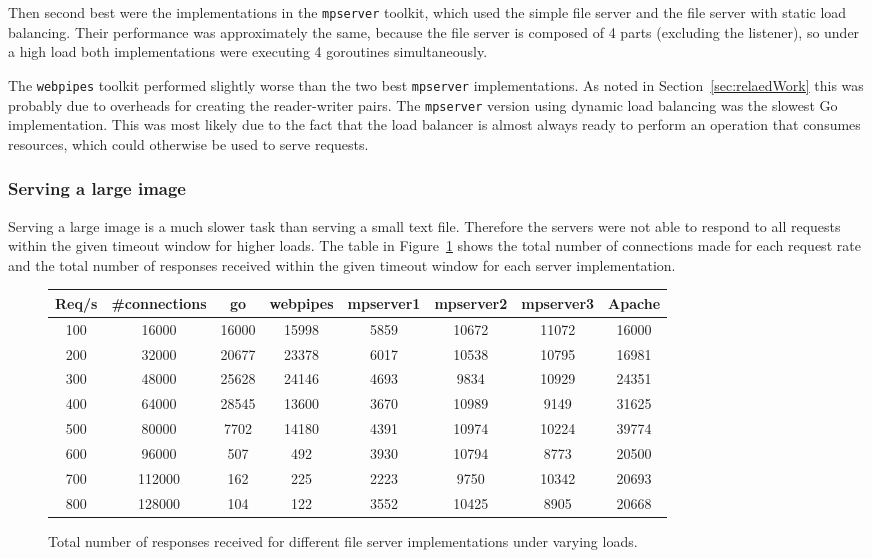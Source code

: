 Then second best were the implementations in the \texttt{mpserver}
toolkit, which used the simple file server and the file server with static load 
balancing. Their performance was approximately the same, because the file server is composed of 
4 parts (excluding the listener), so under a high load both implementations 
were executing 4 goroutines simultaneously. 

The \texttt{webpipes} toolkit performed slightly worse than the two best
\texttt{mpserver} implementations. As noted in Section~\ref{sec:relaedWork} this was probably
due to overheads for creating the reader-writer pairs.
The \texttt{mpserver} version using dynamic load balancing was the slowest Go implementation.
This was most likely due to the fact that the load balancer is almost always ready to perform
an operation that consumes resources, which could otherwise be used to serve requests.

\subsubsection{Serving a large image}
Serving a large image is a much slower task than serving a small text file.
Therefore the servers were not able to respond to all requests within the
given timeout window for higher loads. The table in Figure~\ref{results2} shows
the total number of connections made for each request rate and the total number
of responses received within the given timeout window for each server implementation.

\begin{figure}[h]
\begin{center}
\begin{adjustwidth}{-.5in}{-.5in} 
\begin{tabular}{|c|c|c|c|c|c|c|c|}
\hline
Req/s & \#connections & go    & webpipes & mpserver1 & mpserver2 & mpserver3 & Apache \\
\hline
100   & 16000        & 16000 & 15998    & 5859      & 10672     & 11072     & 16000 \\
200   & 32000        & 20677 & 23378    & 6017      & 10538     & 10795     & 16981 \\
300   & 48000        & 25628 & 24146    & 4693      & 9834      & 10929     & 24351 \\
400   & 64000        & 28545 & 13600    & 3670      & 10989     & 9149      & 31625 \\
500   & 80000        & 7702  & 14180    & 4391      & 10974     & 10224     & 39774 \\
600   & 96000        & 507   & 492      & 3930      & 10794     & 8773      & 20500 \\
700   & 112000       & 162   & 225      & 2223      & 9750      & 10342     & 20693 \\
800   & 128000       & 104   & 122      & 3552      & 10425     & 8905      & 20668 \\
\hline
\end{tabular}
\end{adjustwidth}
\end{center}
\caption{Total number of responses received for different file server implementations under varying loads.}
\label{results2}
\end{figure}

